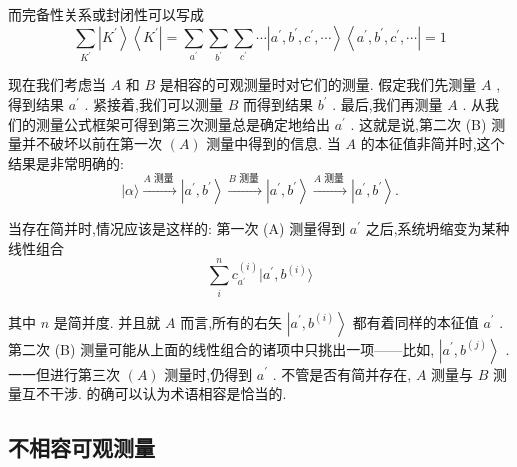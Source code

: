 	而完备性关系或封闭性可以写成
	\begin{equation}
		\mathop{\sum }\limits_{{K}^{\prime }}\left| {K}^{\prime }\right\rangle \left\langle {K}^{\prime }\right| = \mathop{\sum }\limits_{{a}^{\prime }}\mathop{\sum }\limits_{{b}^{\prime }}\mathop{\sum }\limits_{{c}^{\prime }}\cdots \left| {{a}^{\prime },{b}^{\prime },{c}^{\prime },\cdots }\right\rangle \left\langle {{a}^{\prime },{b}^{\prime },{c}^{\prime },\cdots }\right| = 1
	\end{equation}
	
	现在我们考虑当 $A$ 和 $B$ 是相容的可观测量时对它们的测量. 假定我们先测量 $A$ ,得到结果 ${a}^{\prime }$ . 紧接着,我们可以测量 $B$ 而得到结果 ${b}^{\prime }$ . 最后,我们再测量 $A$ . 从我们的测量公式框架可得到第三次测量总是确定地给出 ${a}^{\prime }$ . 这就是说,第二次 (B) 测量并不破坏以前在第一次 $\left( A\right)$ 测量中得到的信息. 当 $A$ 的本征值非简并时,这个结果是非常明确的:
	\begin{equation}
		| {\alpha \rangle \xrightarrow[]{A\text{ 测量 }}\left| {{a}^{\prime },{b}^{\prime }}\right\rangle \xrightarrow[]{B\text{ 测量 }}\left| {{a}^{\prime },{b}^{\prime }}\right\rangle \xrightarrow[]{A\text{ 测量 }}\left| {{a}^{\prime },{b}^{\prime }}\right\rangle .}
	\end{equation}
	
	当存在简并时,情况应该是这样的: 第一次 (A) 测量得到 ${a}^{\prime }$ 之后,系统坍缩变为某种线性组合
	\begin{equation}
		\mathop{\sum }\limits_{i}^{n}{c}_{{a}^{\prime }}^{\left( i\right) }| {{a}^{\prime },{b}^{\left( i\right) }}\rangle
	\end{equation}
	
	其中 $n$ 是简并度. 并且就 $A$ 而言,所有的右矢 $\left| {{a}^{\prime },{b}^{\left( i\right) }}\right\rangle$ 都有着同样的本征值 ${a}^{\prime }$ . 第二次 (B) 测量可能从上面的线性组合的诸项中只挑出一项——比如, $\left| {{a}^{\prime },{b}^{\left( j\right) }}\right\rangle$ . 一一但进行第三次 $\left( A\right)$ 测量时,仍得到 ${a}^{\prime }$ . 不管是否有简并存在, $A$ 测量与 $B$ 测量互不干涉. 的确可以认为术语相容是恰当的.
	
	\subsection{不相容可观测量}
	
